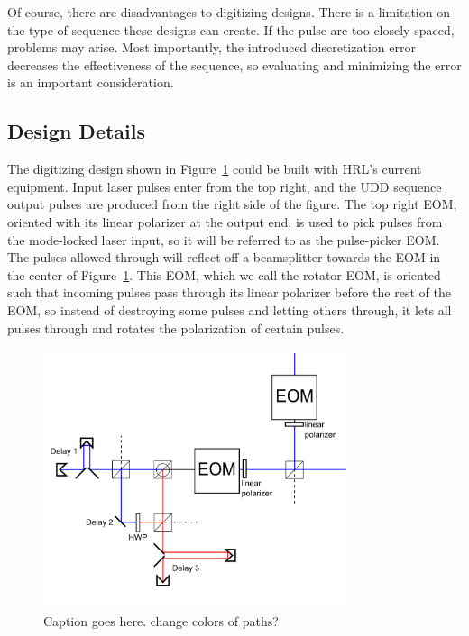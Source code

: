 \documentclass[pdftex,12pt,a4paper]{article}
\begin{document}
Of course, there are disadvantages to digitizing designs. There is a limitation on the type of sequence these designs can create. If the pulse are too closely spaced, problems may arise. Most importantly, the introduced discretization error decreases the effectiveness of the sequence, so evaluating and minimizing the error is an important consideration.

\subsection{Design Details}

The digitizing design shown in Figure~\ref{fig:digdesign1} could be built with HRL's current equipment. Input laser pulses enter from the top right, and the UDD sequence output pulses are produced from the right side of the figure. The top right EOM, oriented with its linear polarizer at the output end, is used to pick pulses from the mode-locked laser input, so it will be referred to as the pulse-picker EOM. The pulses allowed through will reflect off a beamsplitter towards the EOM in the center of Figure~\ref{fig:digdesign1}. This EOM, which we call the rotator EOM, is oriented such that incoming pulses pass through its linear polarizer before the rest of the EOM, so instead of destroying some pulses and letting others through, it lets all pulses through and rotates the polarization of certain pulses. 

\begin{figure}[t]
\centering
\includegraphics[width=0.8\textwidth]{digdesign1.png}
\caption{Caption goes here. change colors of paths?}
\label{fig:digdesign1}
\end{figure}
\end{document}
